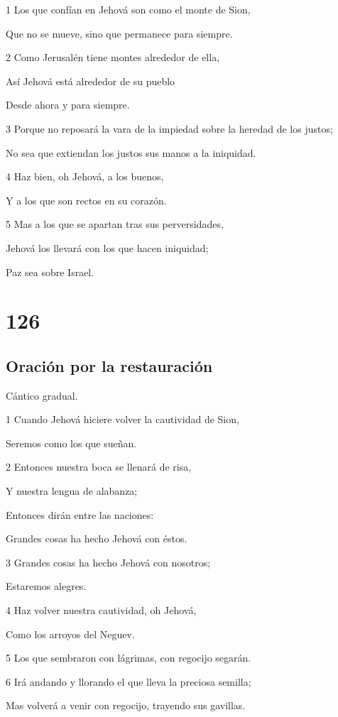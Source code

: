 \par 1 Los que confían en Jehová son como el monte de Sion,
\par Que no se mueve, sino que permanece para siempre.
\par 2 Como Jerusalén tiene montes alrededor de ella,
\par Así Jehová está alrededor de su pueblo
\par Desde ahora y para siempre.
\par 3 Porque no reposará la vara de la impiedad sobre la heredad de los justos;
\par No sea que extiendan los justos sus manos a la iniquidad.
\par 4 Haz bien, oh Jehová, a los buenos,
\par Y a los que son rectos en su corazón.
\par 5 Mas a los que se apartan tras sus perversidades,
\par Jehová los llevará con los que hacen iniquidad;
\par Paz sea sobre Israel.

\chapter{126}

\section*{Oración por la restauración}

\par Cántico gradual.

\par 1 Cuando Jehová hiciere volver la cautividad de Sion,
\par Seremos como los que sueñan.
\par 2 Entonces nuestra boca se llenará de risa,
\par Y nuestra lengua de alabanza;
\par Entonces dirán entre las naciones:
\par Grandes cosas ha hecho Jehová con éstos.
\par 3 Grandes cosas ha hecho Jehová con nosotros;
\par Estaremos alegres.
\par 4 Haz volver nuestra cautividad, oh Jehová,
\par Como los arroyos del Neguev.
\par 5 Los que sembraron con lágrimas, con regocijo segarán.
\par 6 Irá andando y llorando el que lleva la preciosa semilla;
\par Mas volverá a venir con regocijo, trayendo sus gavillas.

